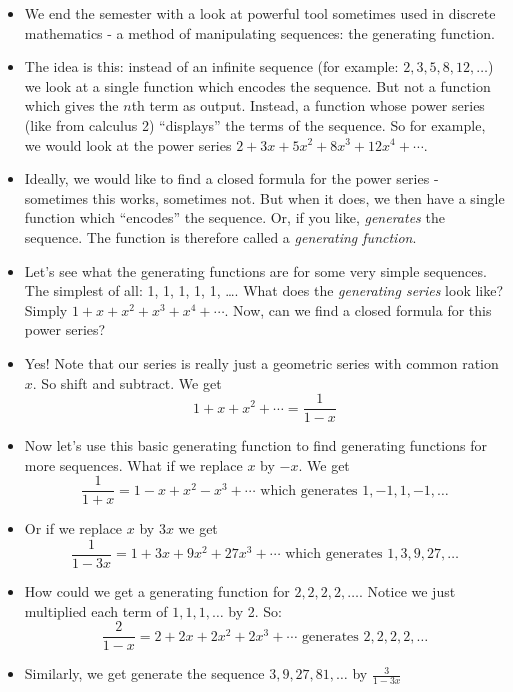 \begin{itemize}
 \item We end the semester with a look at powerful tool sometimes used in discrete mathematics - a method of manipulating sequences: the generating function.
 \item The idea is this: instead of an infinite sequence (for example: $2, 3, 5, 8, 12, \ldots$) we look at a single function which encodes the sequence.  But not a function which gives the $n$th term as output.  Instead, a function whose power series (like from calculus 2) ``displays'' the terms of the sequence.  So for example, we would look at the power series $2 + 3x + 5x^2 + 8x^3 + 12x^4 + \cdots$.
 
 \item Ideally, we would like to find a closed formula for the power series - sometimes this works, sometimes not.  But when it does, we then have a single function which ``encodes'' the sequence.  Or, if you like, {\em generates} the sequence.  The function is therefore called a {\em generating function}.
 
 \item Let's see what the generating functions are for some very simple sequences.  The simplest of all: 1, 1, 1, 1, 1, \ldots.  What does the {\em generating series} look like?  Simply $1 + x + x^2 + x^3 + x^4 + \cdots$.  Now, can we find a closed formula for this power series?
 
 \item Yes!  Note that our series is really just a geometric series with common ration $x$.  So shift and subtract.  We get \[1 + x + x^2 + \cdots = \dfrac{1}{1-x}\]
 
 \item Now let's use this basic generating function to find generating functions for more sequences.  What if we replace $x$ by $-x$.  We get 
 \[\frac{1}{1+x} = 1 - x + x^2 - x^3 + \cdots \mbox{ which generates } 1, -1, 1, -1, \ldots\]
 
 \item Or if we replace $x$ by $3x$ we get
 \[\frac{1}{1-3x} = 1 + 3x + 9x^2 + 27x^3 + \cdots \mbox{ which generates } 1, 3, 9, 27, \ldots\]
 
 \item How could we get a generating function for $2, 2, 2, 2, \ldots$.  Notice we just multiplied each term of $1, 1, 1, \ldots$ by 2.  So:
 \[\frac{2}{1-x} = 2 + 2x + 2x^2 + 2x^3 + \cdots \mbox{ generates } 2, 2, 2, 2, \ldots\]
 
 \item Similarly, we get generate the sequence $3, 9, 27, 81, \ldots$ by $\frac{3}{1-3x}$
 

\end{itemize}
